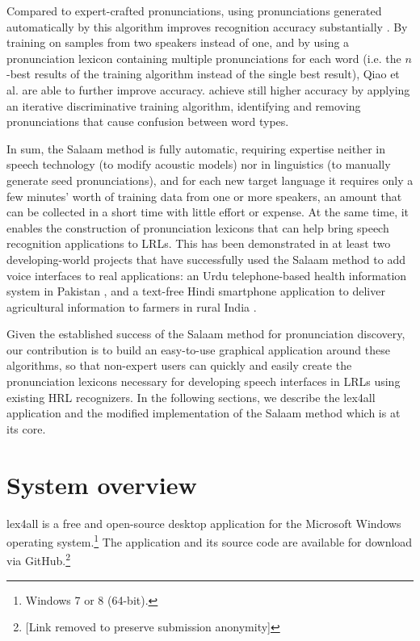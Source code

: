 \documentclass[11pt]{article}
\begin{document}
Compared to expert-crafted pronunciations, using pronunciations generated automatically by this algorithm improves recognition accuracy substantially \cite[\S5.2]{Qiao10}. By training on samples from two speakers instead of one, and by using a pronunciation lexicon containing multiple pronunciations for each word (i.e. the $n$-best results of the training algorithm instead of the single best result), Qiao et al. are able to further improve accuracy.  achieve still higher accuracy by applying an iterative discriminative training algorithm, identifying and removing pronunciations that cause confusion between word types.

In sum, the Salaam method is fully automatic, requiring expertise neither in speech technology (to modify acoustic models) nor in linguistics (to manually generate seed pronunciations), and for each new target language it requires only a few minutes' worth of training data from one or more speakers, an amount that can be collected in a short time with little effort or expense. At the same time, it enables the construction of pronunciation lexicons that can help bring speech recognition applications to LRLs. This has been demonstrated in at least two developing-world projects that have successfully used the Salaam method to add voice interfaces to real applications: an Urdu telephone-based health information system in Pakistan \cite{Sherwani09}, and a text-free Hindi smartphone application to deliver agricultural information to farmers in rural India \cite{bali13}.


Given the established success of the Salaam method for pronunciation discovery, our contribution is to build an easy-to-use graphical application around these algorithms, so that non-expert users can quickly and easily create the pronunciation lexicons necessary for developing speech interfaces in LRLs using existing HRL recognizers. In the following sections, we describe the lex4all application and the modified implementation of the Salaam method which is at its core.


\section{System overview}
\label{sec:overview}

lex4all is a free and open-source desktop application for the Microsoft Windows operating system.\footnote{Windows 7 or 8 (64-bit).}  The application and its source code are available for download via GitHub.\footnote{[Link removed to preserve submission anonymity]}
\end{document}
